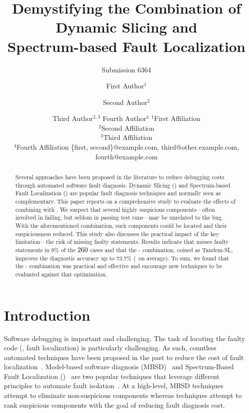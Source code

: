 \documentclass{article}
\title{Demystifying the Combination of Dynamic Slicing and \\ Spectrum-based Fault
Localization}
\author{
    Submission 6364
}
\author{
First Author$^1$
\and
Second Author$^2$\and
Third Author$^{2,3}$\And
Fourth Author$^4$
\affiliations
$^1$First Affiliation\\
$^2$Second Affiliation\\
$^3$Third Affiliation\\
$^4$Fourth Affiliation
\emails
\{first, second\}@example.com,
third@other.example.com,
fourth@example.com
}
\begin{document}
\maketitle

\begin{abstract}
Several approaches have been proposed in the literature to reduce
debugging costs through automated software fault diagnosis.  Dynamic
Slicing (\ds{}) and Spectrum-based Fault Localization (\sfl{}) are
popular fault diagnosis techniques and normally seen as complementary.
This paper reports on a comprehensive study
to evaluate the effects of combining \ds{} with \sfl{}. We suspect
that several highly suspicious components---often involved in failing,
but seldom in passing test runs---may be unrelated to the bug. With
the aforementioned combination, such components could be located and
their suspiciousness reduced.  This study also discusses the practical
impact of the \ds{} key limitation---the risk of missing faulty
statements. Results indicate that \ds{} misses faulty statements in
$9\%$ of the $\numFaults{}$ cases and that
the \ds{}-\sfl{} combination, coined as Tandem-SL, improves
the diagnostic accuracy up to $73.7\%$ (\avgImprov\ on average). To sum,
we found that the \ds{}-\sfl{} combination was practical and effective
and encourage new \sfl{} techniques to be evaluated against that
optimization.
\end{abstract}


\section{Introduction}

Software debugging is important and challenging. The task of locating
the faulty code (\ie{}, fault localization) is particularly
challenging. As such, countless automated techniques have been
proposed in the past to reduce the cost of fault
localization~\cite{7390282}. Model-based software diagnosis
(MBSD)~\cite{REITER198757,DEKLEER200325} and Spectrum-Based Fault
Localization (\sfl{})~\cite{DBLP:journals/stvr/HarroldRSWY00} are two
popular techniques that leverage different principles to automate
fault isolation~\cite{DBLP:conf/sac/AbreuGZG08}.  At a high-level,
MBSD
techniques~\cite{wotawa2002model,Mayer:2008:EMM:1642931.1642950,mayer2008prioritising,Perez:2018:LQR:3304889.3304927,Ko:2008:DRA:1368088.1368130}
attempt to eliminate non-suspicious components whereas \sfl{}
techniques attempt to rank suspicious components with the goal of
reducing fault diagnosis cost.
\end{document}
